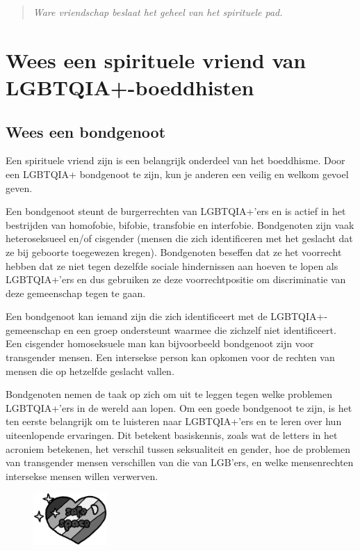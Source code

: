 \documentclass[12pt,openany]{book}
\begin{document}
\begin{quote}
\centering
\textit{\Large Ware vriendschap beslaat het geheel van het spirituele pad.}
\end{quote}

\chapter*{Wees een spirituele vriend van LGBTQIA+-boeddhisten}

\section*{Wees een bondgenoot}

Een spirituele vriend zijn is een belangrijk onderdeel van het boeddhisme. Door een LGBTQIA+ bondgenoot te zijn, kun je anderen een veilig en welkom gevoel geven.

Een  bondgenoot steunt de burgerrechten van LGBTQIA+’ers en is actief in het bestrijden van homofobie, bifobie, transfobie en interfobie. Bondgenoten zijn vaak heteroseksueel en/of cisgender (mensen die zich identificeren met het geslacht dat ze bij geboorte toegewezen kregen). Bondgenoten beseffen dat ze het voorrecht hebben dat ze niet tegen dezelfde sociale hindernissen aan hoeven te lopen als LGBTQIA+’ers en dus gebruiken ze deze voorrechtpositie om discriminatie van deze gemeenschap tegen te gaan. 

Een bondgenoot kan iemand zijn die zich identificeert met de LGBTQIA+-gemeenschap en een groep ondersteunt waarmee die zichzelf niet identificeert. Een cisgender homoseksuele man kan bijvoorbeeld bondgenoot zijn voor transgender mensen. Een intersekse person kan opkomen voor de rechten van mensen die op hetzelfde geslacht vallen.

Bondgenoten nemen de taak op zich om uit te leggen tegen welke problemen LGBTQIA+’ers in de wereld aan lopen. Om een goede bondgenoot te zijn, is het ten eerste belangrijk om te luisteren naar LGBTQIA+’ers en te leren over hun uiteenlopende ervaringen. Dit betekent basiskennis, zoals wat de letters in het acroniem betekenen, het verschil tussen seksualiteit en gender, hoe de problemen van transgender mensen verschillen van die van LGB’ers, en welke mensenrechten intersekse mensen willen verwerven.
\begin{figure}
    \centering
    \includegraphics[width=0.25\textwidth]{12bw.png}
\end{figure}
\end{document}
